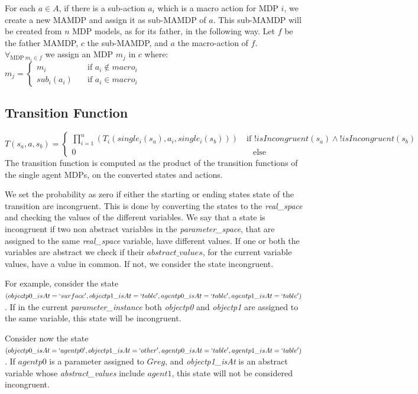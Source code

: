 For each $a \in A$, if there is a sub-action $a_i$ which is a macro action for MDP $i$, we create a new MAMDP and assign it as sub-MAMDP of $a$. This sub-MAMDP will be created from $n$ MDP models, as for its father, in the following way. Let $f$ be the father MAMDP, $c$ the sub-MAMDP, and $a$ the macro-action of $f$. \\
 $ \forall_{\text{MDP}\> m_i \in f}$ we assign an MDP $m_j$ in $c$ where:\\
$m_j= \begin{cases}
	m_i & \quad \text{if } a_i \not\in macro_i \\
	sub_i(a_i) & \quad \text{if } a_i \in macro_i 
\end{cases}$ \\

\subsection{Transition Function}
$T(s_a,a,s_b)=
\begin{cases}
\prod_{i=1}^{n}(T_i(single_i(s_a),a_i,single_i(s_b))) & \> \text{if } !isIncongruent(s_a) \land  !isIncongruent(s_b)  \\
0   & \quad \text{else}
	\end{cases}$ \\

The transition function is computed as the product of the transition functions of the single agent MDPs, on the converted states and actions.

We set the probability as zero if either the starting or ending states state of the transition are incongruent. This is done by converting the states to the \textit{real\_space} and checking the values of the different variables. We say that a state is incongruent if two non abstract variables in the \textit{parameter\_space}, that are assigned to the same \textit{real\_space} variable, have different values. If one or both the variables are abstract we check if their $abstract\_values$, for the current variable values, have a value in common. If not, we consider the state incongruent.

For example, consider the state $(objectp0\_isAt=`surface', objectp1\_isAt=`table', agentp0\_isAt=`table', agentp1\_isAt=`table')$. If in the current \textit{parameter\_instance} both \textit{objectp0} and \textit{objectp1} are assigned to the same variable, this state will be incongruent.

Consider now the state $(objectp0\_isAt=`agentp0', objectp1\_isAt=`other', agentp0\_isAt=`table', agentp1\_isAt=`table')$. If $agentp0$ is a parameter assigned to $Greg$, and \textit{objectp1\_isAt} is an abstract variable whose \textit{abstract\_values} include $agent1$, this state will not be considered incongruent.  

